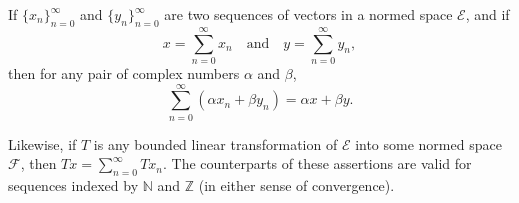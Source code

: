 If $\{x_n\}_{n=0}^{\infty}$ and $\{y_n\}_{n=0}^{\infty}$ are two sequences of vectors in a normed space $\mathcal{E}$, and if
$$x = \sum_{n=0}^{\infty} x_n \quad \text{and} \quad y = \sum_{n=0}^{\infty} y_n,$$
then for any pair of complex numbers $\alpha$ and $\beta$,
$$\sum_{n=0}^{\infty} (\alpha x_n + \beta y_n) = \alpha x + \beta y.$$

Likewise, if $T$ is any bounded linear transformation of $\mathcal{E}$ into some normed space $\mathcal{F}$, then $Tx = \sum_{n=0}^{\infty} Tx_n$. The counterparts of these assertions are valid for sequences indexed by $\mathbb{N}$ and $\mathbb{Z}$ (in either sense of convergence).
